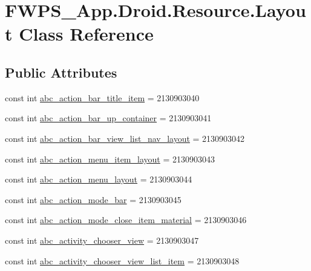 \hypertarget{class_f_w_p_s___app_1_1_droid_1_1_resource_1_1_layout}{}\section{F\+W\+P\+S\+\_\+\+App.\+Droid.\+Resource.\+Layout Class Reference}
\label{class_f_w_p_s___app_1_1_droid_1_1_resource_1_1_layout}
\subsection*{Public Attributes}
\begin{DoxyCompactItemize}
\item 
const int \mbox{\hyperlink{class_f_w_p_s___app_1_1_droid_1_1_resource_1_1_layout_a44046c0598a4ec60522e0720692a1f47}{abc\+\_\+action\+\_\+bar\+\_\+title\+\_\+item}} = 2130903040
\item 
const int \mbox{\hyperlink{class_f_w_p_s___app_1_1_droid_1_1_resource_1_1_layout_ab0c8b451cc27d6b64880f35961b898b3}{abc\+\_\+action\+\_\+bar\+\_\+up\+\_\+container}} = 2130903041
\item 
const int \mbox{\hyperlink{class_f_w_p_s___app_1_1_droid_1_1_resource_1_1_layout_aa4d882b97ad52db5ab72c8486dc20f7b}{abc\+\_\+action\+\_\+bar\+\_\+view\+\_\+list\+\_\+nav\+\_\+layout}} = 2130903042
\item 
const int \mbox{\hyperlink{class_f_w_p_s___app_1_1_droid_1_1_resource_1_1_layout_a9adb8759bdf32802fe169b2bd1981547}{abc\+\_\+action\+\_\+menu\+\_\+item\+\_\+layout}} = 2130903043
\item 
const int \mbox{\hyperlink{class_f_w_p_s___app_1_1_droid_1_1_resource_1_1_layout_a9ef65fe259a5783837dad00fd1a949ae}{abc\+\_\+action\+\_\+menu\+\_\+layout}} = 2130903044
\item 
const int \mbox{\hyperlink{class_f_w_p_s___app_1_1_droid_1_1_resource_1_1_layout_ab4a8327012fab5dd50c30d621c8f7125}{abc\+\_\+action\+\_\+mode\+\_\+bar}} = 2130903045
\item 
const int \mbox{\hyperlink{class_f_w_p_s___app_1_1_droid_1_1_resource_1_1_layout_a1ca07867d80fd813dbc8790719c4a8e1}{abc\+\_\+action\+\_\+mode\+\_\+close\+\_\+item\+\_\+material}} = 2130903046
\item 
const int \mbox{\hyperlink{class_f_w_p_s___app_1_1_droid_1_1_resource_1_1_layout_ab7310de24e068157f7ffd6f0903d99a7}{abc\+\_\+activity\+\_\+chooser\+\_\+view}} = 2130903047
\item 
const int \mbox{\hyperlink{class_f_w_p_s___app_1_1_droid_1_1_resource_1_1_layout_a88bf760d6d55bfe5d39ecea71950e054}{abc\+\_\+activity\+\_\+chooser\+\_\+view\+\_\+list\+\_\+item}} = 2130903048

\end{DoxyCompactItemize}
